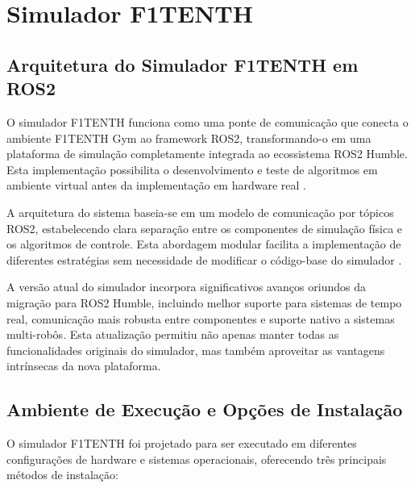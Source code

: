\chapter{Simulador F1TENTH}

\section{Arquitetura do Simulador F1TENTH em ROS2}

O simulador F1TENTH funciona como uma ponte de comunicação que conecta o
ambiente F1TENTH Gym ao framework ROS2, transformando-o em uma plataforma de
simulação completamente integrada ao ecossistema ROS2 Humble. Esta
implementação possibilita o desenvolvimento e teste de algoritmos em ambiente
virtual antes da implementação em hardware real \cite{f1tenthgymufabc}.

A arquitetura do sistema baseia-se em um modelo de comunicação por tópicos
ROS2, estabelecendo clara separação entre os componentes de simulação física e
os algoritmos de controle. Esta abordagem modular facilita a implementação de
diferentes estratégias sem necessidade de modificar o código-base do simulador
\cite{f1tenthgymros}.

A versão atual do simulador incorpora significativos avanços oriundos da
migração para ROS2 Humble, incluindo melhor suporte para sistemas de tempo
real, comunicação mais robusta entre componentes e suporte nativo a sistemas
multi-robôs. Esta atualização permitiu não apenas manter todas as
funcionalidades originais do simulador, mas também aproveitar as vantagens
intrínsecas da nova plataforma.

\section{Ambiente de Execução e Opções de Instalação}

O simulador F1TENTH foi projetado para ser executado em diferentes
configurações de hardware e sistemas operacionais, oferecendo três principais
métodos de instalação:

